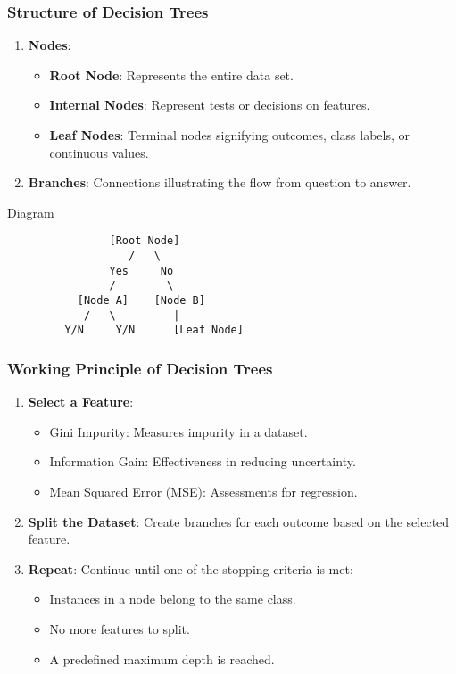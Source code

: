 \documentclass[aspectratio=169]{beamer}
\begin{document}
\begin{frame}[fragile]
    \frametitle{Structure of Decision Trees}
    \begin{enumerate}
        \item \textbf{Nodes}:
            \begin{itemize}
                \item \textbf{Root Node}: Represents the entire data set.
                \item \textbf{Internal Nodes}: Represent tests or decisions on features.
                \item \textbf{Leaf Nodes}: Terminal nodes signifying outcomes, class labels, or continuous values.
            \end{itemize}
        \item \textbf{Branches}: Connections illustrating the flow from question to answer.
    \end{enumerate}

    \begin{block}{Diagram}
        \begin{verbatim}
                [Root Node]
                   /   \
                Yes     No
                /        \
           [Node A]    [Node B]
            /   \         |
         Y/N     Y/N      [Leaf Node]
        \end{verbatim}
    \end{block}
\end{frame}

\begin{frame}[fragile]
    \frametitle{Working Principle of Decision Trees}
    \begin{enumerate}
        \item \textbf{Select a Feature}:
            \begin{itemize}
                \item Gini Impurity: Measures impurity in a dataset.
                \item Information Gain: Effectiveness in reducing uncertainty.
                \item Mean Squared Error (MSE): Assessments for regression.
            \end{itemize}
        \item \textbf{Split the Dataset}: Create branches for each outcome based on the selected feature.
        \item \textbf{Repeat}: Continue until one of the stopping criteria is met:
            \begin{itemize}
                \item Instances in a node belong to the same class.
                \item No more features to split.
                \item A predefined maximum depth is reached.
            \end{itemize}
    \end{enumerate}
\end{frame}
\end{document}

